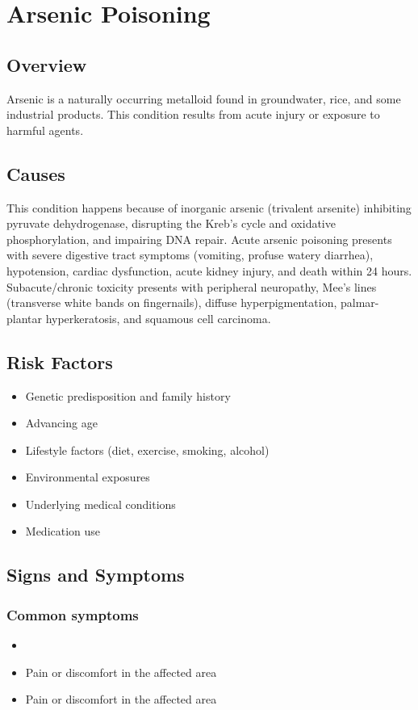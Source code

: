 \chapter{Arsenic Poisoning}
\label{sec:Arsenic Poisoning}

\section{Overview}
Arsenic is a naturally occurring metalloid found in groundwater, rice, and some industrial products. This condition results from acute injury or exposure to harmful agents.
\section{Causes}
This condition happens because of inorganic arsenic (trivalent arsenite) inhibiting pyruvate dehydrogenase, disrupting the Kreb's cycle and oxidative phosphorylation, and impairing DNA repair. Acute arsenic poisoning presents with severe digestive tract symptoms (vomiting, profuse watery diarrhea), hypotension, cardiac dysfunction, acute kidney injury, and death within 24 hours. Subacute/chronic toxicity presents with peripheral neuropathy, Mee's lines (transverse white bands on fingernails), diffuse hyperpigmentation, palmar-plantar hyperkeratosis, and squamous cell carcinoma.     
\section{Risk Factors}

\begin{itemize}[noitemsep]
  \item Genetic predisposition and family history
  \item Advancing age
  \item Lifestyle factors (diet, exercise, smoking, alcohol)
  \item Environmental exposures
  \item Underlying medical conditions
  \item Medication use
\end{itemize}
\section{Signs and Symptoms}

\subsection{Common symptoms}
\begin{itemize}[noitemsep]
  \item \item Pain or discomfort in the affected area    \item Pain or discomfort in the affected area
  \end{itemize}

